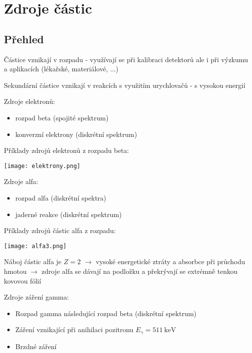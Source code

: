 \documentclass[../../main.tex]{subfiles}
\begin{document}
\chapter{Zdroje částic}

\section{Přehled}

Částice vznikají v rozpadu - využívají se při kalibraci detektorů ale i při výzkumu a aplikacích (lékařské, materiálové, ...)

Sekundární částice vznikají v reakcích s využitím urychlovačů - s vysokou energií

Zdroje elektronů:
\begin{itemize}
	\item rozpad beta (spojité spektrum)
	\item konverzní elektrony (diskrétní spektrum)
\end{itemize} 

Příklady zdrojů elektronů z rozpadu beta:
\begin{center}
	\texttt{[image: elektrony.png]}
\end{center}

Zdroje alfa:
\begin{itemize}
	\item rozpad alfa (diskrétní spektra)
	\item jaderné reakce (diskrétní spektrum)
\end{itemize}

Příklady zdrojů částic alfa z rozpadu:
\begin{center}
	\texttt{[image: alfa3.png]}
\end{center}

Náboj částic alfa je $Z=2$ $\rightarrow$ vysoké energetické ztráty a absorbce při průchodu hmotou $\rightarrow$ zdroje alfa se dávají na podložku a překrývají se extrémně tenkou kovovou fólií

Zdroje záření gamma:
\begin{itemize}
	\item Rozpad gamma následující rozpad beta (diskrétní spektrum)
	\item Záření vznikající při anihilaci pozitronu $E_{\gamma} = 511 ~\mathrm{keV}$
	\item Brzdné záření
\end{itemize}
\end{document}
